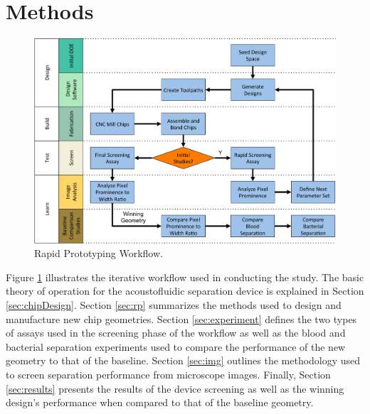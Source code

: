 \section{Methods}
\label{sec:methods}

\begin{figure}[htb]
  \begin{minipage}[t]{0.99\linewidth}\centering
    \includegraphics[width=14cm]{flow.pdf}
  \end{minipage}\hfill
\caption{Rapid Prototyping Workflow.}
\label{fig:flow}       %
\end{figure}


Figure \ref{fig:flow} illustrates the iterative workflow used in conducting the study. The basic theory of operation for the acoustofluidic separation device is explained in Section \ref{sec:chipDesign}. Section \ref{sec:rp} summarizes the methods used to design and manufacture new chip geometries. Section \ref{sec:experiment} defines the two types of assays used in the screening phase of the workflow as well as the blood and bacterial separation experiments used to compare the performance of the new geometry to that of the baseline. Section \ref{sec:img} outlines the methodology used to screen separation performance from microscope images. Finally, Section \ref{sec:results} presents the results of the device screening as well as the winning design's performance when compared to that of the baseline geometry. 

